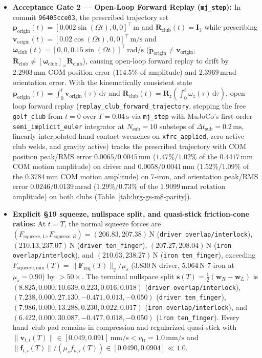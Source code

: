 \documentclass[11pt,a4paper]{article}
\begin{document}
\begin{itemize}
  \item \textbf{Acceptance Gate 2 --- Open-Loop Forward Replay (\texttt{mj\_step}):} In commit \texttt{96405cce03}, the prescribed trajectory set $\mathbf{p}_{\mathrm{origin}}(t) = [0.002\sin(\Omega t), 0, 0]^{\top}\,\mathrm{m}$ and $\mathbf{R}_{\mathrm{club}}(t) = \mathbf{I}_3$ while prescribing $\mathbf{v}_{\mathrm{origin}}(t) = [0.02\cos(\Omega t), 0, 0]^{\top}\,\mathrm{m/s}$ and $\boldsymbol{\omega}_{\mathrm{club}}(t) = [0, 0, 0.15\sin(\Omega t)]^{\top}\,\mathrm{rad/s}$ ($\dot{\mathbf{p}}_{\mathrm{origin}} \neq \mathbf{v}_{\mathrm{origin}}$, $\dot{\mathbf{R}}_{\mathrm{club}} \neq [\boldsymbol{\omega}_{\mathrm{club}}]_{\times}\mathbf{R}_{\mathrm{club}}$), causing open-loop forward replay to drift by $2.2903\,\mathrm{mm}$ COM position error ($114.5\%$ of amplitude) and $2.3969\,\mathrm{mrad}$ orientation error. With the kinematically consistent state $\mathbf{p}_{\mathrm{origin}}(t) = \int_0^t \mathbf{v}_{\mathrm{origin}}(\tau)\,\mathrm{d}\tau$ and $\mathbf{R}_{\mathrm{club}}(t) = \mathbf{R}_z(\int_0^t \omega_z(\tau)\,\mathrm{d}\tau)$, open-loop forward replay (\texttt{replay\_club\_forward\_trajectory}, stepping the free \texttt{golf\_club} from $t = 0$ over $T = 0.04\,\mathrm{s}$ via \texttt{mj\_step} with MuJoCo's first-order \texttt{semi\_implicit\_euler} integrator at $N_{\mathrm{sub}} = 10$ substeps of $\Delta t_{\mathrm{sub}} = 0.2\,\mathrm{ms}$, linearly interpolated hand contact wrenches on \texttt{xfrc\_applied}, zero active club welds, and gravity active) tracks the prescribed trajectory with COM position peak/RMS error $0.0065 / 0.0045\,\mathrm{mm}$ ($1.47\% / 1.02\%$ of the $0.4417\,\mathrm{mm}$ COM motion amplitude) on driver and $0.0058 / 0.0041\,\mathrm{mm}$ ($1.52\% / 1.09\%$ of the $0.3784\,\mathrm{mm}$ COM motion amplitude) on 7-iron, and orientation peak/RMS error $0.0246 / 0.0139\,\mathrm{mrad}$ ($1.29\% / 0.73\%$ of the $1.9099\,\mathrm{mrad}$ rotation amplitude) on both clubs (Table~\ref{tab:hrg-gs-m8-parity}).
  \item \textbf{Explicit \S 19 squeeze, nullspace split, and quasi-stick friction-cone ratios:} At $t = T$, the normal squeeze forces are $(F_{\mathrm{squeeze},L}, F_{\mathrm{squeeze},R}) = (206.83, 207.38)\,\mathrm{N}$ (\texttt{driver overlap/interlock}), $(210.13, 237.07)\,\mathrm{N}$ (\texttt{driver ten\_finger}), $(207.27, 208.04)\,\mathrm{N}$ (\texttt{iron overlap/interlock}), and $(210.63, 238.27)\,\mathrm{N}$ (\texttt{iron ten\_finger}), exceeding $F_{\mathrm{squeeze,min}}(T) = \|\mathbf{F}_{\mathrm{req}}(T)\|_2 / \mu_s$ ($3.830\,\mathrm{N}$ driver, $5.064\,\mathrm{N}$ 7-iron at $\mu_s = 0.90$) by $> 50\times$. The terminal nullspace split $\mathbf{s}(T) = \frac{1}{2}(\mathbf{w}_R - \mathbf{w}_L)$ is $(8.825, 0.000, 10.639, 0.223, 0.016, 0.018)$ (\texttt{driver overlap/interlock}), $(7.238, 0.000, 27.130, -0.471, 0.013, -0.050)$ (\texttt{driver ten\_finger}), $(7.986, 0.000, 13.288, 0.230, 0.022, 0.017)$ (\texttt{iron overlap/interlock}), and $(6.422, 0.000, 30.087, -0.477, 0.018, -0.050)$ (\texttt{iron ten\_finger}). Every hand--club pad remains in compression and regularized quasi-stick with $\|\mathbf{v}_{t,i}(T)\| \in [0.049, 0.091]\,\mathrm{mm/s} < v_{\mathrm{tr}} = 1.0\,\mathrm{mm/s}$ and $\|\mathbf{f}_{t,i}(T)\| / (\mu_s f_{n,i}(T)) \in [0.0490, 0.0904] \ll 1.0$.

\end{itemize}
\end{document}
